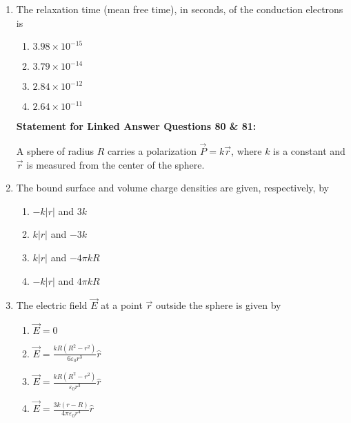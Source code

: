 \documentclass[journal,12pt,onecolumn]{IEEEtran}
\theoremstyle{remark}
\begin{document}
\begin{enumerate}
    \item The relaxation time (mean free time), in seconds, of the conduction electrons is
    \begin{multicols}{2}
    \begin{enumerate}
        \item $3.98 \times 10^{-15}$
        \item $3.79 \times 10^{-14}$
        \item $2.84 \times 10^{-12}$
        \item $2.64 \times 10^{-11}$
    \end{enumerate}
    \end{multicols}


\bigskip

\textbf{Statement for Linked Answer Questions 80 \& 81:}

A sphere of radius $R$ carries a polarization $\vec{P} = k\vec{r}$, where $k$ is a constant and $\vec{r}$ is measured from the center of the sphere.


    \item  The bound surface and volume charge densities are given, respectively, by
    \begin{multicols}{2}
    \begin{enumerate}
        \item $-k|r|$ and $3k$
        \item $k|r|$ and $-3k$
        \item $k|r|$ and $-4\pi k R$
        \item $-k|r|$ and $4\pi k R$
    \end{enumerate}
    \end{multicols}

    \item  The electric field $\vec{E}$ at a point $\vec{r}$ outside the sphere is given by
    \begin{multicols}{2}
    \begin{enumerate}
        \item $\vec{E} = 0$\\
        \item $\vec{E} = \frac{kR(R^2 - r^2)}{6 \varepsilon_0 r^3} \hat{r}$
        \item $\vec{E} = \frac{kR(R^2 - r^2)}{\varepsilon_0 r^3} \hat{r}$\\
        \item $\vec{E} = \frac{3k(r - R)}{4\pi \varepsilon_0 r^4} \hat{r}$
    \end{enumerate}
    \end{multicols}




\end{enumerate}
\end{document}

